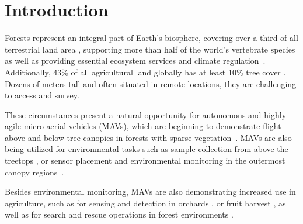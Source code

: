 
\section{Introduction}
Forests represent an integral part of Earth's biosphere, covering over a third of all terrestrial land area \cite{FAO2020a}, supporting more than half of the world's vertebrate species \cite{Pillay2022} as well as providing essential ecosystem services and climate regulation~\cite{Brockerhoff2017}. %
Additionally, 43\% of all agricultural land globally has at least 10\% tree cover \cite{Zomer2016}. Dozens of meters tall and often situated in remote locations, they are challenging to access and survey.

These circumstances present a natural opportunity for autonomous and highly agile micro aerial vehicles (MAVs), which are beginning to demonstrate flight above and below tree canopies in forests with sparse vegetation~\cite{Zhou2022, Liu2022}. MAVs are also being utilized for environmental tasks such as sample collection from above the treetops \cite{Charron2020}, or sensor placement and environmental monitoring in the outermost canopy regions~\cite{Geckeler2022a, Aucone2023a, Hamaza}.

Besides environmental monitoring, MAVs are also demonstrating increased use in agriculture, such as for sensing and detection in orchards \cite{Zhang2021}, or fruit harvest \cite{Tevel}, as well as for search and rescue operations in forest environments \cite{Schedl2021}. 

